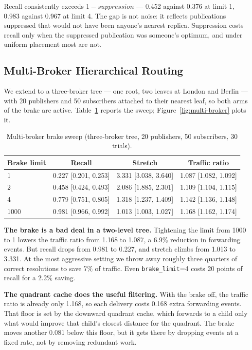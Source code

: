 \documentclass[10pt]{article}
\begin{document}
Recall consistently exceeds $1 - \textit{suppression}$ --- 0.452 against 0.376 at limit 1, 0.983 against 0.967 at limit 4. The gap is not noise: it reflects publications suppressed that would not have been anyone's nearest replica. Suppression costs recall only when the suppressed publication was someone's optimum, and under uniform placement most are not.

\subsection{Multi-Broker Hierarchical Routing}
\label{sec:multi-brake}

We extend to a three-broker tree --- one root, two leaves at London and Berlin --- with 20 publishers and 50 subscribers attached to their nearest leaf, so both arms of the brake are active. Table~\ref{tab:multi-broker} reports the sweep; Figure~\ref{fig:multi-broker} plots it.

\begin{table}[t]
\centering
\caption{Multi-broker brake sweep (three-broker tree, 20 publishers, 50 subscribers, 30 trials).}
\label{tab:multi-broker}
\begin{tabular}{lccc}
\toprule
Brake limit & Recall & Stretch & Traffic ratio \\
\midrule
1    & 0.227 [0.201, 0.253] & 3.331 [3.038, 3.640] & 1.087 [1.082, 1.092] \\
2    & 0.458 [0.424, 0.493] & 2.086 [1.885, 2.301] & 1.109 [1.104, 1.115] \\
4    & 0.779 [0.751, 0.805] & 1.318 [1.237, 1.409] & 1.142 [1.136, 1.148] \\
1000 & 0.981 [0.966, 0.992] & 1.013 [1.003, 1.027] & 1.168 [1.162, 1.174] \\
\bottomrule
\end{tabular}
\end{table}

\textbf{The brake is a bad deal in a two-level tree.} Tightening the limit from 1000 to 1 lowers the traffic ratio from 1.168 to 1.087, a 6.9\% reduction in forwarding events. But recall drops from 0.981 to 0.227, and stretch climbs from 1.013 to 3.331. At the most aggressive setting we throw away roughly three quarters of correct resolutions to save 7\% of traffic. Even \texttt{brake\_limit}=4 costs 20 points of recall for a 2.2\% saving.

\textbf{The quadrant cache does the useful filtering.} With the brake off, the traffic ratio is already only 1.168, so each delivery costs 0.168 extra forwarding events. That floor is set by the downward quadrant cache, which forwards to a child only what would improve that child's closest distance for the quadrant. The brake moves another 0.081 below this floor, but it gets there by dropping events at a fixed rate, not by removing redundant work.
\end{document}
